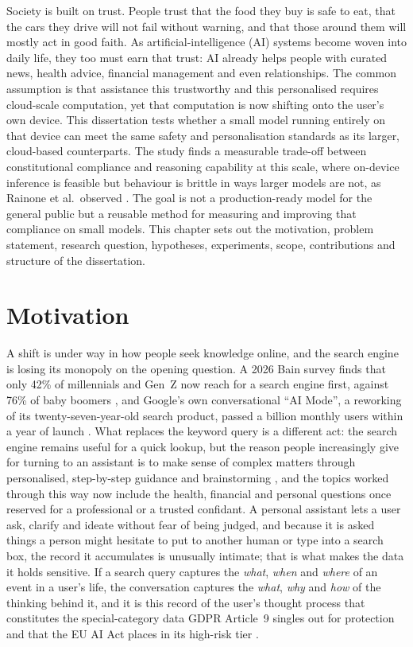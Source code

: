 Society is built on trust. People trust that the food they buy is safe to eat, that the cars they drive will not fail without warning, and that those around them will mostly act in good faith. As artificial-intelligence (AI) systems become woven into daily life, they too must earn that trust: AI already helps people with curated news, health advice, financial management and even relationships. The common assumption is that assistance this trustworthy and this personalised requires cloud-scale computation, yet that computation is now shifting onto the user's own device. This dissertation tests whether a small model running entirely on that device can meet the same safety and personalisation standards as its larger, cloud-based counterparts. The study finds a measurable trade-off between constitutional compliance and reasoning capability at this scale, where on-device inference is feasible but behaviour is brittle in ways larger models are not, as Rainone et al.\ observed \cite{rainone2025replacingthinkingtoolusage}. The goal is not a production-ready model for the general public but a reusable method for measuring and improving that compliance on small models. This chapter sets out the motivation, problem statement, research question, hypotheses, experiments, scope, contributions and structure of the dissertation.

\section{Motivation}
\label{sec:motivation}

A shift is under way in how people seek knowledge online, and the search engine is losing its monopoly on the opening question. A 2026 Bain survey finds that only 42\% of millennials and Gen~Z now reach for a search engine first, against 76\% of baby boomers \cite{bain2026snapchart}, and Google's own conversational ``AI Mode'', a reworking of its twenty-seven-year-old search product, passed a billion monthly users within a year of launch \cite{reid2026aisearch}. What replaces the keyword query is a different act: the search engine remains useful for a quick lookup, but the reason people increasingly give for turning to an assistant is to make sense of complex matters through personalised, step-by-step guidance and brainstorming \cite{bain2026snapchart}, and the topics worked through this way now include the health, financial and personal questions once reserved for a professional or a trusted confidant. A personal assistant lets a user ask, clarify and ideate without fear of being judged, and because it is asked things a person might hesitate to put to another human or type into a search box, the record it accumulates is unusually intimate; that is what makes the data it holds sensitive. If a search query captures the \emph{what}, \emph{when} and \emph{where} of an event in a user's life, the conversation captures the \emph{what}, \emph{why} and \emph{how} of the thinking behind it, and it is this record of the user's thought process that constitutes the special-category data GDPR Article~9 singles out for protection \cite{gdpr2016} and that the EU AI Act places in its high-risk tier \cite{europeanparliament2024regulationeu20241689}.

